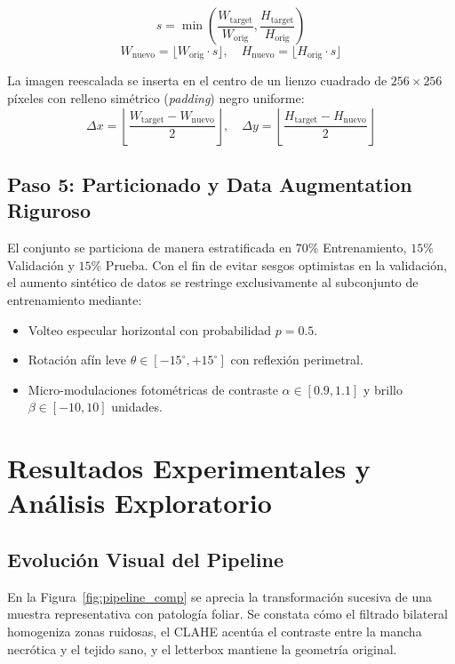 \documentclass[12pt,a4paper]{article}
\begin{document}
\begin{equation}
s = \min\left( \frac{W_{\text{target}}}{W_{\text{orig}}}, \frac{H_{\text{target}}}{H_{\text{orig}}} \right)
\end{equation}
\begin{equation}
W_{\text{nuevo}} = \lfloor W_{\text{orig}} \cdot s \rfloor, \quad H_{\text{nuevo}} = \lfloor H_{\text{orig}} \cdot s \rfloor
\end{equation}

La imagen reescalada se inserta en el centro de un lienzo cuadrado de $256 \times 256$ píxeles con relleno simétrico (\textit{padding}) negro uniforme:
\begin{equation}
\Delta x = \left\lfloor \frac{W_{\text{target}} - W_{\text{nuevo}}}{2} \right\rfloor, \quad \Delta y = \left\lfloor \frac{H_{\text{target}} - H_{\text{nuevo}}}{2} \right\rfloor
\end{equation}

\subsection{Paso 5: Particionado y Data Augmentation Riguroso}
El conjunto se particiona de manera estratificada en $70\%$ Entrenamiento, $15\%$ Validación y $15\%$ Prueba. Con el fin de evitar sesgos optimistas en la validación, el aumento sintético de datos se restringe exclusivamente al subconjunto de entrenamiento mediante:
\begin{itemize}
    \item Volteo especular horizontal con probabilidad $p = 0.5$.
    \item Rotación afín leve $\theta \in [-15^\circ, +15^\circ]$ con reflexión perimetral.
    \item Micro-modulaciones fotométricas de contraste $\alpha \in [0.9, 1.1]$ y brillo $\beta \in [-10, 10]$ unidades.
\end{itemize}

\section{Resultados Experimentales y Análisis Exploratorio}

\subsection{Evolución Visual del Pipeline}
En la Figura~\ref{fig:pipeline_comp} se aprecia la transformación sucesiva de una muestra representativa con patología foliar. Se constata cómo el filtrado bilateral homogeniza zonas ruidosas, el CLAHE acentúa el contraste entre la mancha necrótica y el tejido sano, y el letterbox mantiene la geometría original.
\end{document}
